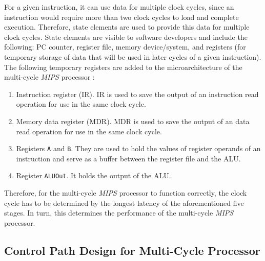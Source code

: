 For a given instruction, it can use data for multiple clock cycles, since an instruction would require more than two clock cycles to load and complete execution. Therefore, state elements are used to provide this data for multiple clock cycles. State elements are visible to software developers and include the following: PC counter, register file, memory device/system, and registers (for temporary storage of data that will be used in later cycles of a given instruction). The following temporary registers are added to the microarchitecture of the multi-cycle {\it MIPS} processor \cite{Patterson2005}: \vspace{-0.3cm}
\begin{enumerate} \itemsep -4pt
\item Instruction register (IR). IR is used to save the output of an instruction read operation for use in the same clock cycle.
\item Memory data register (MDR). MDR is used to save the output of an data read operation for use in the same clock cycle.
\item Registers {\tt A} and {\tt B}. They are used to hold the values of register operands of an instruction and serve as a buffer between the register file and the ALU.
\item Register {\tt ALUOut}. It holds the output of the ALU.
\end{enumerate}

Therefore, for the multi-cycle {\it MIPS} processor to function correctly, the clock cycle has to be determined by the longest latency of the aforementioned five stages. In turn, this determines the performance of the multi-cycle {\it MIPS} processor.


\subsection{Control Path Design for Multi-Cycle Processor}
\label{ssec:ControlPathDesignforMultiCycleProcessors}

